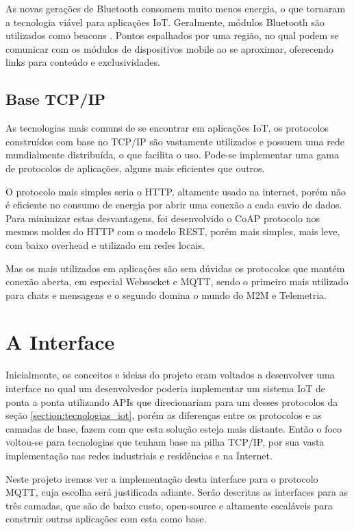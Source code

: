 As novas gerações de Bluetooth consomem muito menos energia, o que tornaram a tecnologia viável para aplicações IoT. Geralmente, módulos Bluetooth são utilizados como beacons \cite{Endeavor:Beacons}. Pontos espalhados por uma região, no qual podem se comunicar com os módulos de dispositivos mobile ao se aproximar, oferecendo links para conteúdo e exclusividades.

\subsection{Base TCP/IP}
\label{subsection:tcpip}

As tecnologias mais comuns de se encontrar em aplicações IoT, os protocolos construídos com base no TCP/IP são vastamente utilizados e possuem uma rede mundialmente distribuída, o que facilita o uso. Pode-se implementar uma gama de protocolos de aplicações, alguns mais eficientes que outros.

O protocolo mais simples seria o HTTP, altamente usado na internet, porém não é eficiente no consumo de energia por abrir uma conexão a cada envio de dados. Para minimizar estas desvantagens, foi desenvolvido o CoAP \cite{coap} protocolo nos mesmos moldes do HTTP com o modelo REST, porém mais simples, mais leve, com baixo overhead e utilizado em redes locais.

Mas os mais utilizados em aplicações são sem dúvidas os protocolos que mantém conexão aberta, em especial Websocket e MQTT, sendo o primeiro mais utilizado para chats e mensagens e o segundo domina o mundo do M2M e Telemetria.


\section{A Interface}
\label{section:interface}

Inicialmente, os conceitos e ideias do projeto eram voltados a desenvolver uma interface no qual um desenvolvedor poderia implementar um sistema IoT de ponta a ponta utilizando APIs que direcionariam para um desses protocolos da seção \ref{section:tecnologias_iot}, porém as diferenças entre os protocolos e as camadas de base, fazem com que esta solução esteja mais distante. Então o foco voltou-se  para tecnologias que tenham base na pilha TCP/IP, por sua vasta implementação nas redes industriais e residências e na Internet.

Neste projeto iremos ver a implementação desta interface para o protocolo MQTT, cuja escolha será justificada adiante. Serão descritas as interfaces para as três camadas, que são de baixo custo, open-source e altamente escaláveis para construir outras aplicações com esta como base.
 
